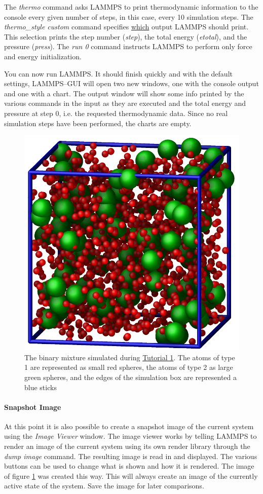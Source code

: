 \documentclass[9pt,tutorial]{livecoms}
\renewcommand{\emph}[1]{\underline{#1}}
\begin{document}
The \textit{thermo} command asks LAMMPS to print thermodynamic
information to the console every given number of steps, in this case,
every 10 simulation steps.  The \textit{thermo\_style custom} command specifies
\emph{which} output LAMMPS should print.  This selection prints the
step number (\textit{step}), the total energy (\textit{etotal}), and the
pressure (\textit{press}).  The \textit{run 0} command instructs LAMMPS
to perform only force and energy initialization.

You can now run LAMMPS.  It should finish quickly and with the default
settings, LAMMPS--GUI will open two new windows, one with the console
output and one with a chart.  The output window will show some info
printed by the various commands in the input as they are executed and
the total energy and pressure at step 0, i.e. the requested thermodynamic
data.  Since no real simulation steps have been performed, the charts
are empty.

\begin{figure}
\centering
\includegraphics[width=0.55\linewidth]{LJ}
\caption{The binary mixture simulated during \hyperref[lennard-jones-label]{Tutorial 1}.
  The atoms of type 1 are represented as small red spheres, the atoms of type 2 as large
  green spheres, and the edges of the simulation box are represented a blue sticks}
\label{fig:LJ}
\end{figure}

\paragraph{Snapshot Image}

At this point it is also possible to create a snapshot image of the
current system using the \textit{Image Viewer} window.  The image viewer
works by telling LAMMPS to render an image of the current system using
its own render library through the \textit{dump image} command.  The
resulting image is read in and displayed.  The various buttons can be
used to change what is shown and how it is rendered.  The image of
figure \ref{fig:LJ} was created this way.  This will always create an
image of the currently active state of the system.  Save the image for
later comparisons.
\end{document}
